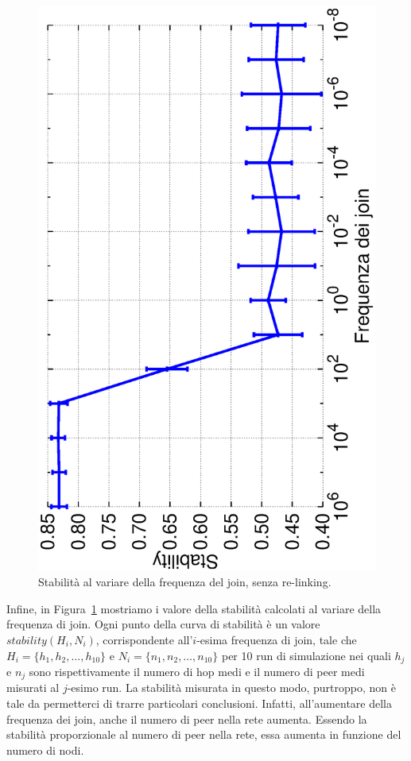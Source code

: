 \documentclass[prodmode,acmtap]{acmlarge}
\begin{document}
\begin{figure}	
\centering
	\includegraphics[scale=.35, angle=-90]{imgs/norelink-freq-stability.eps}
\caption{Stabilità al variare della frequenza del join, senza re-linking.}
\label{img:stabilita2}
\end{figure}

Infine, in Figura~\ref{img:stabilita2} mostriamo i valore della stabilità calcolati al variare della frequenza di join. Ogni punto della curva di stabilità è un valore $stability(H_i,N_i)$, corrispondente all'$i$-esima frequenza di join, tale che $H_i = \{ h_1, h_2, \dots, h_{10} \}$ e $N_i = \{ n_1, n_2, \dots, n_{10} \}$ per 10 run di simulazione nei quali $h_j$ e $n_j$ sono rispettivamente il numero di hop medi e il numero di peer medi misurati al $j$-esimo run. La stabilità misurata in questo modo, purtroppo, non è tale da permetterci di trarre particolari conclusioni. Infatti, all'aumentare della frequenza dei join, anche il numero di peer nella rete aumenta. Essendo la stabilità proporzionale al numero di peer nella rete, essa aumenta in funzione del numero di nodi.
\end{document}
